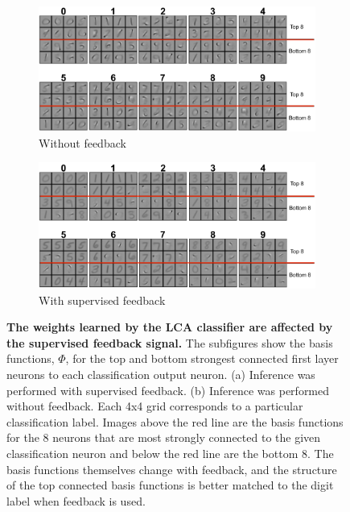 \begin{figure}
    \centering
    \begin{subfigure}[b]{0.9\textwidth}
        \centering
        \includegraphics[width=\textwidth]{figures/lca_nofeedback_classifier_features.png}
        \caption{Without feedback}
        \label{fig:ch3_nofeedback_features}
    \end{subfigure}
    \begin{subfigure}[b]{0.9\textwidth}
        \centering
        \includegraphics[width=\textwidth]{figures/lca_feedback_classifier_features.png}
        \caption{With supervised feedback}
        \label{fig:ch3_feedback_features}
    \end{subfigure}
    \caption{\textbf{The weights learned by the LCA classifier are affected by the supervised feedback signal.} The subfigures show the basis functions, $\Phi$, for the top and bottom strongest connected first layer neurons to each classification output neuron. (a) Inference was performed with supervised feedback. (b) Inference was performed without feedback. Each 4x4 grid corresponds to a particular classification label. Images above the red line are the basis functions for the 8 neurons that are most strongly connected to the given classification neuron and below the red line are the bottom 8. The basis functions themselves change with feedback, and the structure of the top connected basis functions is better matched to the digit label when feedback is used.}
    \label{fig:ch3_feedback_nofeedback_features}
\end{figure}

